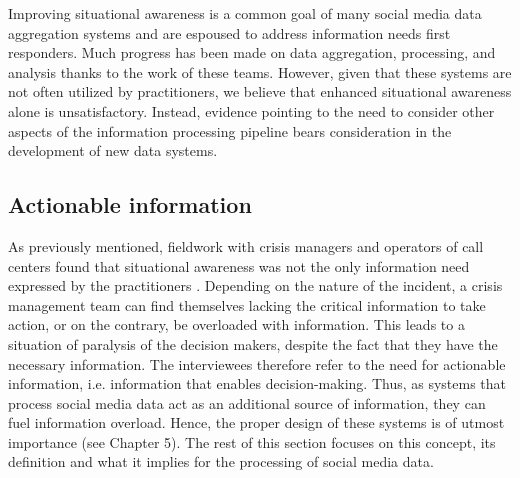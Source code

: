 Improving situational awareness is a common goal of many social media data aggregation systems and are espoused to address information needs first responders.
Much progress has been made on data aggregation, processing, and analysis thanks to the work of these teams.
However, given that these systems are not often utilized by practitioners, we believe that enhanced situational awareness alone is unsatisfactory.
Instead, evidence pointing to the need to consider other aspects of the information processing pipeline bears consideration in the development of new data systems.

\subsection{Actionable information}
As previously mentioned, fieldwork with crisis managers and operators of call centers found
that situational awareness was not the only information need expressed by the practitioners
\parencite{zadeSituationalAwarenessActionability2018, kropczynskiIdentifyingActionableInformation2018}.
Depending on the nature of the incident, a crisis management team can find themselves lacking
the critical information to take action, or on the contrary, be overloaded with information.
This leads to a situation of paralysis of the decision makers, despite the fact that they have the necessary information.
The interviewees therefore refer to the need for actionable information, i.e. information that enables decision-making.
Thus, as systems that process social media data act as an additional source of information, they can fuel information overload.
Hence, the proper design of these systems is of utmost importance (see Chapter 5).
The rest of this section focuses on this concept, its definition and what it implies for the processing of social media data.

